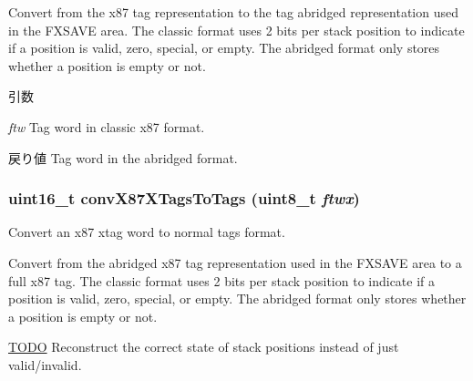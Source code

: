 Convert from the x87 tag representation to the tag abridged representation used in the FXSAVE area. The classic format uses 2 bits per stack position to indicate if a position is valid, zero, special, or empty. The abridged format only stores whether a position is empty or not.


\begin{DoxyParams}{引数}
\item[{\em ftw}]Tag word in classic x87 format. \end{DoxyParams}
\begin{DoxyReturn}{戻り値}
Tag word in the abridged format. 
\end{DoxyReturn}
\hypertarget{namespaceX86ISA_ae196a751ba59507ee189f66f87f62de1}{
\subsubsection[{convX87XTagsToTags}]{\setlength{\rightskip}{0pt plus 5cm}uint16\_\-t convX87XTagsToTags (uint8\_\-t {\em ftwx})}}
\label{namespaceX86ISA_ae196a751ba59507ee189f66f87f62de1}
Convert an x87 xtag word to normal tags format.

Convert from the abridged x87 tag representation used in the FXSAVE area to a full x87 tag. The classic format uses 2 bits per stack position to indicate if a position is valid, zero, special, or empty. The abridged format only stores whether a position is empty or not.

\begin{Desc}
\item[\hyperlink{todo__todo000005}{TODO}]Reconstruct the correct state of stack positions instead of just valid/invalid.\end{Desc}

